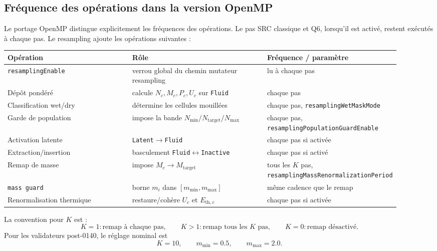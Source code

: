 \documentclass[11pt,a4paper]{article}
\begin{document}
\subsection{Fréquence des opérations dans la version OpenMP}

Le portage OpenMP distingue explicitement les fréquences des opérations. Le pas SRC classique et Q6, lorsqu'il est activé, restent exécutés à chaque pas. Le resampling ajoute les opérations suivantes :
\begin{center}
\small
\begin{tabular}{p{0.33\linewidth}p{0.36\linewidth}p{0.22\linewidth}}
\toprule
Opération & Rôle & Fréquence / paramètre \\
\midrule
\texttt{resamplingEnable} & verrou global du chemin mutateur resampling & lu à chaque pas \\
Dépôt pondéré & calcule $N_c,M_c,P_c,U_c$ sur \texttt{Fluid} & chaque pas \\
Classification wet/dry & détermine les cellules mouillées & chaque pas, \texttt{resamplingWetMaskMode} \\
Garde de population & impose la bande $N_{\min}/N_{\mathrm{target}}/N_{\max}$ & chaque pas, \texttt{resamplingPopulationGuardEnable} \\
Activation latente & \texttt{Latent}$\rightarrow$\texttt{Fluid} & chaque pas si activée \\
Extraction/insertion & basculement \texttt{Fluid}$\leftrightarrow$\texttt{Inactive} & chaque pas si activé \\
Remap de masse & impose $M_c\rightarrow M_{\mathrm{target}}$ & tous les $K$ pas, \texttt{resamplingMassRenormalizationPeriod} \\
\texttt{mass guard} & borne $m_i$ dans $[m_{\min},m_{\max}]$ & même cadence que le remap \\
Renormalisation thermique & restaure/cohère $U_c$ et $E_{\mathrm{th},c}$ & chaque pas si activée \\
\bottomrule
\end{tabular}
\end{center}
La convention pour $K$ est :
\begin{equation}
  K=1 : \text{remap à chaque pas},\qquad
  K>1 : \text{remap tous les }K\text{ pas},\qquad
  K=0 : \text{remap désactivé}.
\end{equation}
Pour les validateurs post-0140, le réglage nominal est
\begin{equation}
  K=10,\qquad m_{\min}=0.5,\qquad m_{\max}=2.0.
\end{equation}
\end{document}
